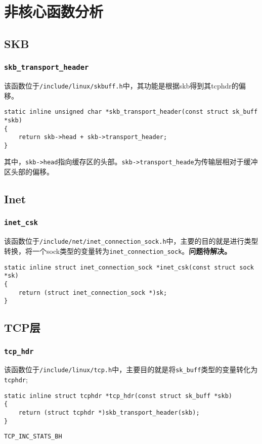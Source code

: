 \chapter{非核心函数分析}

\minitoc

\section{SKB}
	\subsection{\texttt{skb_transport_header}}
		
		该函数位于\texttt{/include/linux/skbuff.h}中，其功能是根据skb得到其tcphdr的偏移。
\begin{verbatim}
static inline unsigned char *skb_transport_header(const struct sk_buff *skb)
{
	return skb->head + skb->transport_header;
}
\end{verbatim}

		其中，\texttt{skb->head}指向缓存区的头部。\texttt{skb->transport_heade}为传输层相对于缓冲区头部的偏移。

\section{Inet}
	\subsection{\texttt{inet_csk}}
		该函数位于\texttt{/include/net/inet_connection_sock.h}中，主要的目的就是进行类型转换，将一个sock类型的变量转为\texttt{inet_connection_sock}。\textbf{问题待解决。}

\begin{verbatim}
static inline struct inet_connection_sock *inet_csk(const struct sock *sk)
{
	return (struct inet_connection_sock *)sk;
}
\end{verbatim}

\section{TCP层}
	\subsection{\texttt{tcp_hdr}}

		该函数位于\texttt{/include/linux/tcp.h}中，主要目的就是将\texttt{sk_buff}类型的变量转化为\texttt{tcphdr};
\begin{verbatim}
static inline struct tcphdr *tcp_hdr(const struct sk_buff *skb)
{
	return (struct tcphdr *)skb_transport_header(skb);
}
\end{verbatim}
	\texttt{TCP_INC_STATS_BH}

